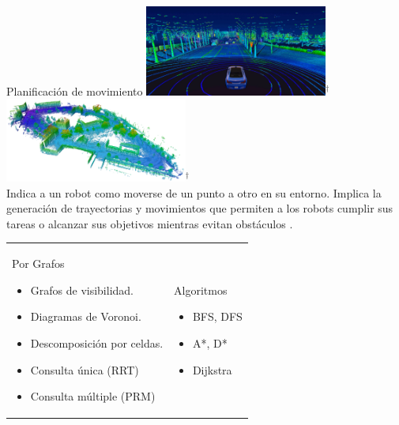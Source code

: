 \documentclass[
  24pt, %
  aspectratio=169, %
]{beamer}
\begin{document}
\begin{frame}{Planificación de movimiento}
  \bigskip %
  \centering
  \includegraphics[width=0.45\textwidth,height=0.30\textheight]{map3d.jpg}$^\dag$
  \hfil
  \includegraphics[width=0.45\textwidth,height=0.30\textheight]{map3d_2}$^\dag$
  \vspace{1pt}\\
  \bigskip %
  Indica a un robot como moverse de un punto a otro en su entorno. Implica la generación de trayectorias y movimientos que permiten a los robots cumplir sus tareas o alcanzar sus objetivos mientras evitan obstáculos \footnotemark.\\
  \bigskip %
  \addvspace{\medskipamount}
  \noindent
  \begin{tabularx}{\linewidth}{ @{} X X @{} }
    Por Grafos
    
    \begin{itemize}
    \item Grafos de visibilidad. 
    \item Diagramas de Voronoi.
    \item Descomposición por celdas.
    \item Consulta única (RRT)
    \item Consulta múltiple (PRM)
    \end{itemize} &

    Algoritmos
    
    \begin{itemize}
    \item BFS, DFS
    \item A*, D*
    \item Dijkstra
    \end{itemize}
  \end{tabularx}
\end{frame}
\end{document}

